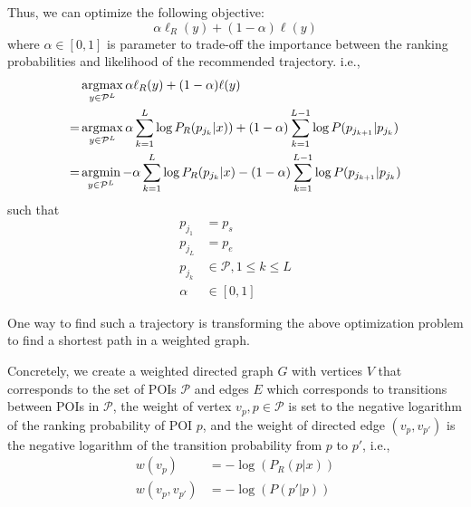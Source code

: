 Thus, we can optimize the following objective:
\begin{displaymath}
    \alpha \ell_R(y) + (1-\alpha) \ell(y)
\end{displaymath}
where $\alpha \in [0, 1]$ is parameter to trade-off the importance between the ranking probabilities 
and likelihood of the recommended trajectory.
i.e.,
\begin{align*}
    & \operatorname*{argmax}_{y \in \mathcal{P}^L} \alpha \ell_R(y) + (1-\alpha) \ell(y) \\
   =& \operatorname*{argmax}_{y \in \mathcal{P}^L} \alpha \sum_{k=1}^L \log P_R(p_{j_k} | x)) + 
      (1-\alpha) \sum_{k=1}^{L-1} \log P(p_{j_{k+1}} | p_{j_k}) \\
   =& \operatorname*{argmin}_{y \in \mathcal{P}^L} - \alpha \sum_{k=1}^L \log P_R(p_{j_k} | x) -
      (1-\alpha) \sum_{k=1}^{L-1} \log P(p_{j_{k+1}} | p_{j_k}) 
\end{align*}
such that
\begin{align*}
    p_{j_1} &= p_s \\
    p_{j_L} &= p_e \\
    p_{j_k} &\in \mathcal{P}, 1 \le k \le L \\
    \alpha  &\in [0, 1]
\end{align*}

One way to find such a trajectory is transforming the above optimization problem to 
find a shortest path in a weighted graph.

Concretely,
we create a weighted directed graph $G$ with vertices $V$ that corresponds to the set of POIs $\mathcal{P}$ and 
edges $E$ which corresponds to transitions between POIs in $\mathcal{P}$,
the weight of vertex $v_{p}, p \in \mathcal{P}$ is set to the negative logarithm of the ranking probability of POI $p$, 
and the weight of directed edge $(v_p, v_{p'})$ is the negative logarithm of the transition probability from $p$ to $p'$,
i.e.,
\begin{align*}
    w(v_{p})       & = -\log(P_R(p | x)) \\
    w(v_p, v_{p'}) & = -\log(P(p' | p))
\end{align*}

